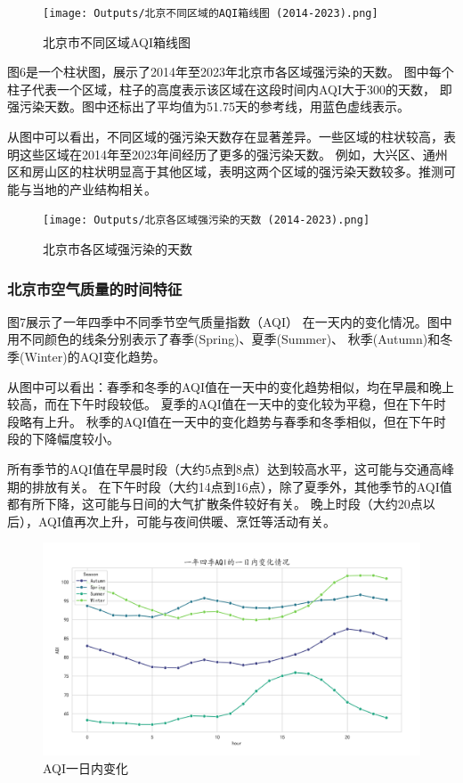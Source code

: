 \documentclass[12pt, a4paper, oneside]{ctexart}
\begin{document}
\begin{figure}[htb]
    \centering
    \texttt{[image: Outputs/北京不同区域的AQI箱线图 (2014-2023).png]}
    \caption{北京市不同区域AQI箱线图}
    \label{fig:air_quality_district}
\end{figure}

\FloatBarrier

图6是一个柱状图，展示了2014年至2023年北京市各区域强污染的天数。
图中每个柱子代表一个区域，柱子的高度表示该区域在这段时间内AQI大于300的天数，
即强污染天数。图中还标出了平均值为51.75天的参考线，用蓝色虚线表示。

从图中可以看出，不同区域的强污染天数存在显著差异。一些区域的柱状较高，表明这些区域在2014年至2023年间经历了更多的强污染天数。
例如，大兴区、通州区和房山区的柱状明显高于其他区域，表明这两个区域的强污染天数较多。推测可能与当地的产业结构相关。
\begin{figure}[ht]
    \centering
    \texttt{[image: Outputs/北京各区域强污染的天数 (2014-2023).png]}
    \caption{北京市各区域强污染的天数}
    \label{fig:air_quality_district_heatmap}
\end{figure}

\FloatBarrier

\subsubsection{北京市空气质量的时间特征}
图7展示了一年四季中不同季节空气质量指数（AQI）
在一天内的变化情况。图中用不同颜色的线条分别表示了春季(Spring)、夏季(Summer)、
秋季(Autumn)和冬季(Winter)的AQI变化趋势。

从图中可以看出：春季和冬季的AQI值在一天中的变化趋势相似，均在早晨和晚上较高，而在下午时段较低。
夏季的AQI值在一天中的变化较为平稳，但在下午时段略有上升。
秋季的AQI值在一天中的变化趋势与春季和冬季相似，但在下午时段的下降幅度较小。

所有季节的AQI值在早晨时段（大约5点到8点）达到较高水平，这可能与交通高峰期的排放有关。
在下午时段（大约14点到16点），除了夏季外，其他季节的AQI值都有所下降，这可能与日间的大气扩散条件较好有关。
晚上时段（大约20点以后），AQI值再次上升，可能与夜间供暖、烹饪等活动有关。
\begin{figure}
    \centering
    \includegraphics[width=\textwidth]{Outputs/AQI一日内变化.png}
    \caption{AQI一日内变化}
    \label{fig:air_quality_time}
\end{figure}
\FloatBarrier
\end{document}
